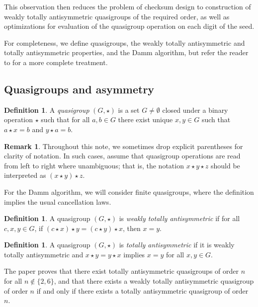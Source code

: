 \documentclass{article}
\theoremstyle{plain}
\theoremstyle{definition}
\newtheorem{remark}[result]{Remark}
\newtheorem{definition}[result]{Definition}
\begin{document}
This observation then reduces the problem of checksum design to construction of weakly totally antisymmetric quasigroups of the required order, as well as optimizations for evaluation of the quasigroup operation on each digit of the seed.

For completeness, we define quasigroups, the weakly totally antisymmetric and totally antisymmetric properties, and the Damm algorithm, but refer the reader to \cite{damm_thesis,damm2000,damm2007} for a more complete treatment.


\subsection{Quasigroups and asymmetry}

\begin{definition}
	A \textit{quasigroup} $(G,\star)$ is a set $G \neq \emptyset$ closed under a binary operation $\star$ such that for all $a,b \in G$ there exist unique $x,y \in G$ such that $a \star x = b$ and $y \star a = b$.
\end{definition}

\begin{remark}
	Throughout this note, we sometimes drop explicit parentheses for clarity of notation.
	In such cases, assume that quasigroup operations are read from left to right where unambiguous; that is, the notation $x \star y \star z$ should be interpreted as $(x \star y) \star z$.
\end{remark}

For the Damm algorithm, we will consider finite quasigroups, where the definition implies the usual cancellation laws.

\begin{definition}
	A quasigroup $(G,\star)$ is \textit{weakly totally antisymmetric} if for all $c,x,y \in G$, if $(c \star x) \star y = (c \star y) \star x$, then $x = y$.
\end{definition}

\begin{definition}
	A quasigroup $(G,\star)$ is \textit{totally antisymmetric} if it is weakly totally antisymmetric and $x \star y = y \star x$ implies $x = y$ for all $x,y \in G$.
\end{definition}

The paper \cite{damm2007} proves that there exist totally antisymmetric quasigroups of order $n$ for all $n \not\in \{2,6\}$, and that there exists a weakly totally antisymmetric quasigroup of order $n$ if and only if there exists a totally antisymmetric quasigroup of order $n$.
\end{document}
